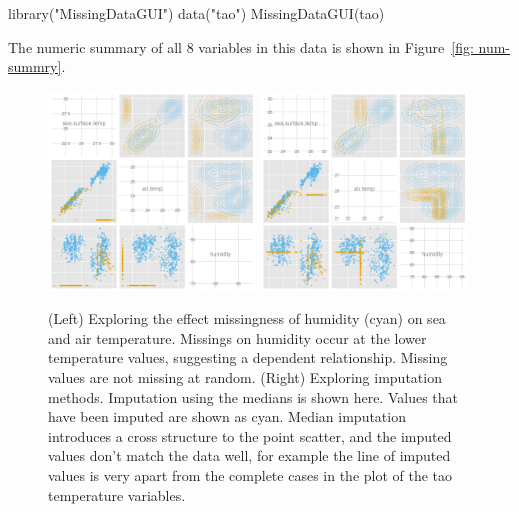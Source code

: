 \documentclass[article]{jss}
\begin{document}
\begin{Code}
library("MissingDataGUI")
data("tao")
MissingDataGUI(tao)
\end{Code}

The numeric summary of all 8 variables in this data is shown in Figure~\ref{fig: num-summry}.


\begin{figure}[htp]
\centerline{\includegraphics[width=0.49\textwidth]{graph/fig4-3-below10-uncondition}
\includegraphics[width=0.49\textwidth]{graph/fig4-1-median-uncondition}}
\caption{(Left) Exploring the effect missingness of humidity (cyan) on sea and air temperature. Missings on humidity occur at the lower temperature values, suggesting a dependent relationship. Missing values are not missing at random. (Right) Exploring imputation methods. Imputation using the medians is shown here. Values that have been imputed are shown as cyan. Median imputation introduces a cross structure to the point scatter, and the imputed values don't match the data well, for example the line of imputed values is very apart from the complete cases in the plot of the tao temperature variables.}
\label{tao1}
\end{figure}
\end{document}
